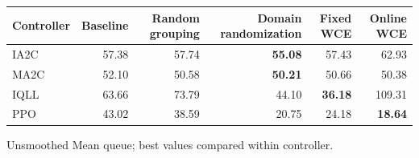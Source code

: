 \begin{tabular}{lrrrrr}
\hline
Controller & Baseline & Random grouping & Domain randomization & Fixed WCE & Online WCE \\
\hline
IA2C & 57.38 & 57.74 & \textbf{55.08} & 57.43 & 62.93 \\
MA2C & 52.10 & 50.58 & \textbf{50.21} & 50.66 & 50.38 \\
IQLL & 63.66 & 73.79 & 44.10 & \textbf{36.18} & 109.31 \\
PPO & 43.02 & 38.59 & 20.75 & 24.18 & \textbf{18.64} \\
\hline
\end{tabular}
Unsmoothed Mean queue; best values compared within controller.
